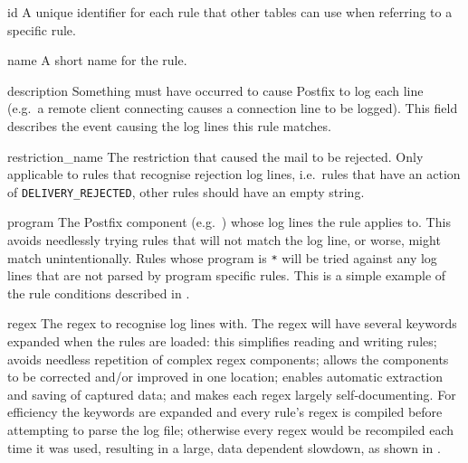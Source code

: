 \begin{boldeqlist}

    \item [id] A unique identifier for each rule that other tables can use
        when referring to a specific rule.

    \item [name] A short name for the rule.

    \item [description] Something must have occurred to cause Postfix to
        log each line (e.g.\ a remote client connecting causes a connection
        line to be logged).  This field describes the event causing the log
        lines this rule matches.

    \item [restriction\_name] The restriction that caused the mail to be
        rejected.  Only applicable to rules that recognise rejection log
        lines, i.e.\ rules that have an action of
        \texttt{DELIVERY\_REJECTED}, other rules should have an empty
        string.

    \item [program] The Postfix component (e.g.\ ) whose log
        lines the rule applies to.  This avoids needlessly trying rules
        that will not match the log line, or worse, might match
        unintentionally.  Rules whose program is \texttt{*} will be tried
        against any log lines that are not parsed by program specific
        rules.  This is a simple example of the rule conditions described
        in .

    \item [regex] The regex to recognise log lines with.  The regex will
        have several keywords expanded when the rules are loaded: this
        simplifies reading and writing rules; avoids needless repetition of
        complex regex components; allows the components to be corrected
        and/or improved in one location; enables automatic extraction and
        saving of captured data; and makes each regex largely
        self-documenting.  For efficiency the keywords are expanded and
        every rule's regex is compiled before attempting to parse the log
        file; otherwise every regex would be recompiled each time it was
        used, resulting in a large, data dependent slowdown, as shown in
        .


\end{boldeqlist}

